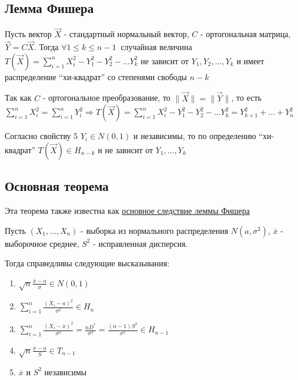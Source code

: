 \documentclass[12pt]{article}
\begin{document}
\subsection{Лемма Фишера}

\begin{MyTheorem}
    Пусть вектор $\vec X$ - стандартный нормальный вектор, $C$ - ортогональная матрица, $\vec Y = C \vec X$.
    Тогда $\forall 1 \leq k \leq n - 1 \ $ случайная величина $T(\vec X) = \sum_{i = 1}^n X_i^2 - Y_1^2 - Y_2^2 - \dots Y_k^2$ 
    не зависит от $Y_1, Y_2, \dots, Y_k$ и имеет распределение \enquote{хи-квадрат} со степенями свободы $n - k$
\end{MyTheorem}

\begin{MyProof}
    Так как $C$ - ортогональное преобразование, то $\|\vec X\| = \|\vec Y\|$, то есть $\sum_{i = 1}^n X^2_i = \sum_{i = 1}^n Y^2_i \Longrightarrow
    T(\vec X) = \sum_{i = 1}^n X_i^2 - Y_1^2 - Y_2^2 - \dots Y_k^2 = Y^2_{k + 1} + \dots + Y^2_{n}$

    Согласно свойству 5 $Y_i \in N(0, 1)$ и независимы, то по определению \enquote{хи-квадрат} $T(\vec X) \in H_{n - k}$ и не зависит от $Y_1, \dots, Y_k$
\end{MyProof}

\subsection{Основная теорема}

Эта теорема также известна как \href{https://tvims.nsu.ru/chernova/ms/lec/node37.html}{основное следствие леммы Фишера}

\begin{MyTheorem}
    \Ths Пусть $(X_1, \dots, X_n)$ - выборка из нормального распределения $N(a, \sigma^2)$, $\overline{x}$ - выборочное среднее, $S^2$ - исправленная дисперсия.

    Тогда справедливы следующие высказывания:

    \begin{enumerate}
        \item $\sqrt{n} \frac{\overline{x} - a}{\sigma} \in N(0, 1)$
        
        \item $\sum_{i = 1}^n \frac{(X_i - a)^2}{\sigma^2} \in H_n$
        
        \item $\sum_{i = 1}^n \frac{(X_i - \overline{x})^2}{\sigma^2} = \frac{n D^*}{\sigma^2} = \frac{(n - 1) S^2}{\sigma^2} \in H_{n - 1}$

        \item $\sqrt{n} \frac{\overline{x} - a}{S} \in T_{n - 1}$
        
        \item $\overline{x}$ и $S^2$ независимы
    \end{enumerate}
\end{MyTheorem}
\end{document}
